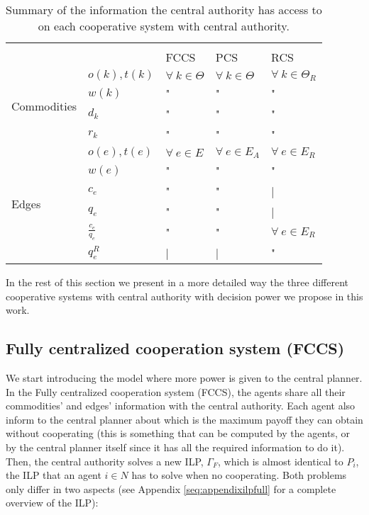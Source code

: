 \documentclass{article}
\begin{document}
\begin{table}[ht!]
	\centering
	\caption{Summary of the information the central authority has access to on each cooperative system with central authority. \label{tb:summarycentralizedmodelsinfo}}
\begin{tabular}{p{}p{}>{\centering}p{}>{\centering}p{}>{\centering\arraybackslash}p{}}
 & & \multicolumn{3}{c}{Coop. systems with central authority} \\\cline{3-5}
 & & FCCS & PCS & RCS \\\toprule
 \multirow{4}{*}{Commodities}  & $o(k),t(k)$ & $\forall\ k\in \Theta$ & $\forall\ k\in \Theta$  & $\forall\ k\in \Theta_R$  \\
 & $w(k)$    & " & " & " \\
 & $d_k$ & " & " & " \\
 & $r_k$ & " & " & " \\

\midrule
 \multirow{6}{*}{Edges}		 &  $o(e),t(e)$ & $\forall\ e\in E$ & $\forall\ e\in E_A$ & $\forall\ e\in E_R$\\
 			 & $w(e)$ & " & " & " \\
   			 & $c_e$  & " & " &  |\\
  			 & $q_e$  & " & " & |\\
 			 & $\frac{c_e}{q_e}$  & " & " &  $\forall\ e\in E_R$\\[3pt]
 			 & $q_e^R$  & | & | & " \\\bottomrule

\end{tabular}


\end{table}

In the rest of this section we present in a more detailed way the three different
cooperative systems with central authority with decision power we propose in this work.


\subsection{Fully centralized cooperation system (FCCS)}

We start introducing the model where more power is given to the central planner.
In the Fully centralized cooperation system (FCCS), the agents share all their commodities' and edges' information with the central authority. Each agent also inform to the central planner about which is the maximum payoff they can obtain without cooperating (this is something that can be computed by the agents, or by the central planner itself since it has all the required information to do it). Then, the central authority solves a new ILP, $\Gamma_F$, which is almost identical to $P_ i$, the ILP that an agent $i\in N$ has to solve when no cooperating. Both problems only differ in
two aspects (see Appendix \ref{seq:appendixilpfull} for a complete overview of the ILP):
\end{document}
